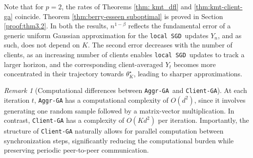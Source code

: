 \documentclass[a4paper,11pt]{article}
\numberwithin{equation}{section}
\theoremstyle{plain}
\theoremstyle{remark}
\newtheorem{remark}{Remark}[section]
\newcommand{\DFL}{\texttt{local SGD}}
\newcommand{\minparam}{\theta^\star_K}
\newcommand{\ag}{\texttt{Aggr-GA}}
\newcommand{\cg}{\texttt{Client-GA}}
\begin{document}
Note that for $p=2$, the rates of Theorems \ref{thm: kmt_dfl} and \ref{thm:kmt-client-ga} coincide. Theorem \ref{thm:berry-esseen suboptimal} is proved in Section \ref{proof:thm3.2}. In both the results, $n^{1-\beta}$ reflects the fundamental error of a generic uniform Gaussian approximation for the \DFL\ updates $Y_n$, and as such, does not depend on $K$. The second error decreases with the number of clients, as an increasing number of clients enables \DFL\ updates to track a larger horizon, and the corresponding client-averaged $Y_t$ becomes more concentrated in their trajectory towards $\minparam$, leading to sharper approximations. 
\begin{remark}[Computational differences between \ag\ and \cg]
   At each iteration $t$, \texttt{Aggr-GA} has a computational complexity of $O(d^2)$, since it involves generating one random sample followed by a matrix-vector multiplication. In contrast, \texttt{Client-GA} has a complexity of $O(Kd^2)$ per iteration. Importantly, the structure of \texttt{Client-GA} naturally allows for parallel computation between synchronization steps, significantly reducing the computational burden while preserving periodic peer-to-peer communication. 
\end{remark}
\end{document}
